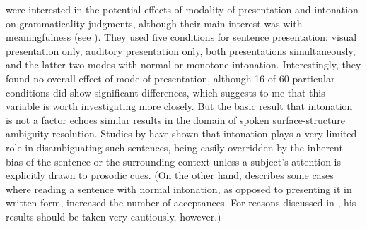 \citet{VetterEtAl1979} were interested in the potential effects of modality of presentation and intonation on grammaticality judgments, although their main interest was with meaningfulness (see ). They used five conditions for sentence presentation: visual presentation only, auditory presentation only, both presentations simultaneously, and the latter two modes with normal or monotone intonation. Interestingly, they found no overall effect of mode of presentation, although 16 of 60 particular conditions did show significant differences, which suggests to me that this variable is worth investigating more closely. But the basic result that intonation is not a factor echoes similar results in the domain of spoken surface-structure ambiguity resolution. Studies by \citet{Berkovits1981,Berkovits1982} have shown that intonation plays a very limited role in disambiguating such sentences, being easily overridden by the inherent bias of the sentence or the surrounding context unless a subject's attention is explicitly drawn to prosodic cues. (On the other hand, \citet{Hill1961} describes some cases where reading a sentence with normal intonation, as opposed to presenting it in written form, increased the number of acceptances. For reasons discussed in , his results should be taken very cautiously, however.)

